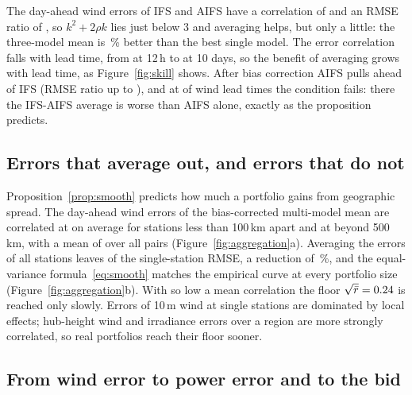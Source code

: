 

 The day-ahead wind errors of IFS and AIFS have a correlation of \valWindIfsAifsErrCorrDayAhead{} and an RMSE ratio of \valWindIfsAifsRatioDayAhead, so $k^2+2\rho k$ lies just below 3 and averaging helps, but only a little: the three-model mean is \valWindMmmGainPct\,\% better than the best single model. The error correlation falls with lead time, from \valWindRawErrCorrTwelve{} at 12\,h to \valWindRawErrCorrTenDay{} at 10 days, so the benefit of averaging grows with lead time, as Figure~\ref{fig:skill} shows. After bias correction AIFS pulls ahead of IFS (RMSE ratio up to \valWindBcMaxRatio), and at \valWindBcCombFailLeads{} of \valNumLeadTimes{} wind lead times the condition fails: there the IFS-AIFS average is worse than AIFS alone, exactly as the proposition predicts.

\subsection{Errors that average out, and errors that do not}



Proposition~\ref{prop:smooth} predicts how much a portfolio gains from geographic spread. The day-ahead wind errors of the bias-corrected multi-model mean are correlated at \valAggCorrNear{} on average for stations less than 100\,km apart and at \valAggCorrFar{} beyond 500\,km, with a mean of \valAggMeanCorr{} over all \valAggNumPairs{} pairs (Figure~\ref{fig:aggregation}a). Averaging the errors of all \valNumStations{} stations leaves \valAggRelRmseAll{} of the single-station RMSE, a reduction of \valAggRelRmseAllPct\,\%, and the equal-variance formula~\eqref{eq:smooth} matches the empirical curve at every portfolio size (Figure~\ref{fig:aggregation}b). With so low a mean correlation the floor $\sqrt{\bar r}=0.24$ is reached only slowly. Errors of 10\,m wind at single stations are dominated by local effects; hub-height wind and irradiance errors over a region are more strongly correlated, so real portfolios reach their floor sooner.

\subsection{From wind error to power error and to the bid}



